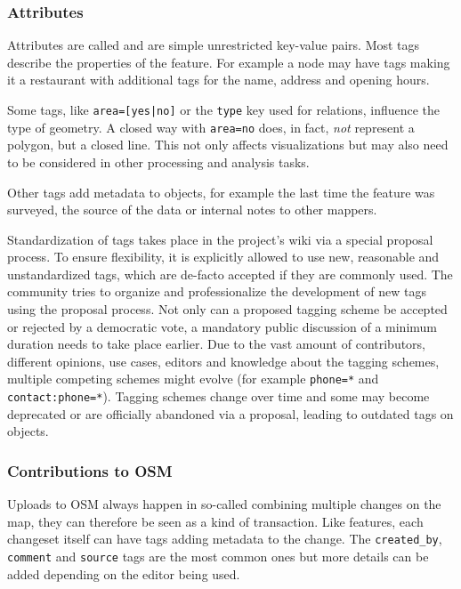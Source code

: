 		\subsubsection{Attributes}
		\label{subsubsec:osm-attributes}
			
			Attributes are called  and are simple unrestricted key-value pairs.
			Most tags describe the properties of the feature.
			For example a node may have tags making it a restaurant with additional tags for the name, address and opening hours.
			
			Some tags, like \texttt{area=[yes|no]} or the \texttt{type} key used for relations, influence the type of geometry.
			A closed way with \texttt{area=no} does, in fact, \textit{not} represent a polygon, but a closed line.
			This not only affects visualizations but may also need to be considered in other processing and analysis tasks.
			
			Other tags add metadata to objects, for example the last time the feature was surveyed, the source of the data or internal notes to other mappers.
			
			Standardization of tags takes place in the project's wiki via a special proposal process.
			To ensure flexibility, it is explicitly allowed to use new, reasonable and unstandardized tags\cite{osm-wiki-proposal-process}, which are de-facto accepted if they are commonly used.
			The community tries to organize and professionalize the development of new tags using the proposal process.
			Not only can a proposed tagging scheme be accepted or rejected by a democratic vote, a mandatory public discussion of a minimum duration needs to take place earlier.
			Due to the vast amount of contributors, different opinions, use cases, editors and knowledge about the tagging schemes, multiple competing schemes might evolve (for example \texttt{phone=*} and \texttt{contact:phone=*}).
			Tagging schemes change over time and some may become deprecated or are officially abandoned via a proposal, leading to outdated tags on objects.
			
		\subsubsection{Contributions to OSM}
		
			Uploads to OSM always happen in so-called  combining multiple changes on the map\cite{osm-wiki-changeset}, they can therefore be seen as a kind of transaction.
			Like features, each changeset itself can have tags adding metadata to the change.
			The \texttt{created\_by}, \texttt{comment} and \texttt{source} tags are the most common ones but more details can be added depending on the editor being used.
			
